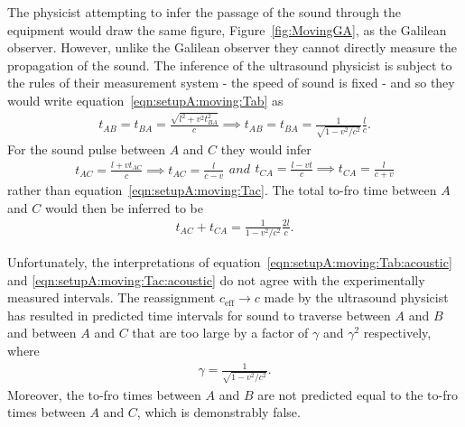 \documentclass[10pt, fleqn,final,showtrims,oldfontcommands, article,a4paper,oneside]{memoir} %
\newcommand{\sub}[1]{\begin{subequations}#1\end{subequations}}
\newcommand{\eqnref}[1]{\ref{eqn:#1}}
\newcommand{\figref}[1]{Figure~\ref{fig:#1}}
\newcommand{\eff}{{\textrm{eff}}}
\begin{document}
The physicist attempting to infer the passage of the sound through the equipment %
 would  draw the same figure, \figref{MovingGA}, as the Galilean observer.
However, unlike the Galilean observer they cannot directly measure the propagation of the sound.
The inference of the ultrasound physicist is subject to the rules of their measurement system - 
the speed of sound is fixed - and so they would write equation~\ref{eqn:setupA:moving:Tab} as 
\begin{align}
  \label{eqn:setupA:moving:Tab:acoustic}
  t_{AB} = t_{BA} =  \frac{\sqrt{l^2+v^2t_{BA}^2}}{c} \implies t_{AB} =  t_{BA} =\frac{1}{\sqrt{1-v^2/c^2}} \frac{l}{c}.
\end{align}
For the sound pulse between $A$ and $C$  they would infer
\sub{
\label{eqn:setupA:moving:Tac:acoustic}
\begin{align}
 t_{AC} =  \frac{l+vt_{AC}}{c}\implies t_{AC} = \frac{l}{c-v}
\end{align}
and 
\begin{align}
 t_{CA} =  \frac{l-vt}{c} \implies t_{CA} = \frac{l}{c+v}
\end{align}
}
rather than  equation~\ref{eqn:setupA:moving:Tac}.
The total to-fro time between $A$ and $C$ would then be inferred to be
\begin{align}
t_{AC}+t_{CA} = \frac{1}{{1-v^2/c^2}} \frac{2l}{c}.
\end{align}

Unfortunately, the interpretations of equation~\ref{eqn:setupA:moving:Tab:acoustic} and \ref{eqn:setupA:moving:Tac:acoustic} do not agree with the
experimentally measured intervals.
The reassignment $c_\eff \rightarrow c$ made by the ultrasound physicist 
has resulted in predicted time intervals for sound to traverse between $A$ and $B$ and between $A$ and $C$ that are too large
by a factor of $\gamma$ and $\gamma^2$ respectively,
where 
\begin{align}
  \gamma = \frac{1}{\sqrt{1-v^2/c^2}}.
  \label{eqn:gamma}
\end{align}
Moreover, the to-fro times between $A$ and $B$ are not predicted equal to the to-fro times between $A$ and $C$,
which is demonstrably false.
\end{document}
